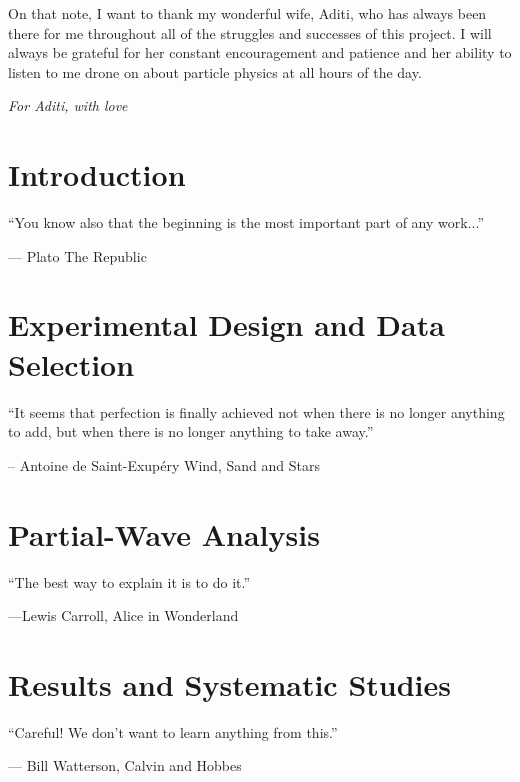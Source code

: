 \documentclass[final]{memoir}
\begin{document}
On that note, I want to thank my wonderful wife, Aditi, who has always been there for me throughout all of the struggles and successes of this project. I will always be grateful for her constant encouragement and patience and her ability to listen to me drone on about particle physics at all hours of the day.
\clearpage
\thispagestyle{empty}
\begin{center}
  \vspace*{\fill}
  {\LARGE\itshape For Aditi, with love\par}
  \vspace*{\fill}
\end{center}
\clearpage
{} %
{
  \makeatletter
  \let\ps@plain\ps@empty   %
  \makeatother
  \begin{KeepFromToc}
    \setcounter{tocdepth}{2}
    \renewcommand{\contentsname}{Table of Contents}
    \tableofcontents
  \end{KeepFromToc}
}
\thispagestyle{empty}
\mainmatter
\chapter{Introduction}
\epigraph{``You know also that the beginning is the most important part of any work...''}{--- \textup{Plato} The Republic}

\chapter{Experimental Design and Data Selection}
\epigraph{``It seems that perfection is finally achieved not when there is no longer anything to add, but when there is no longer anything to take away.''}{-- \textup{Antoine de Saint-Exup\'ery} Wind, Sand and Stars}

\chapter{Partial-Wave Analysis}\label{ch:partial-wave-analysis}
\epigraph{``The best way to explain it is to do it.''}{---\textup{Lewis Carroll}, Alice in Wonderland}

\chapter{Results and Systematic Studies}
\epigraph{``Careful! We don't want to learn anything from this.''}{--- \textup{Bill Watterson}, Calvin and Hobbes}

\end{document}
